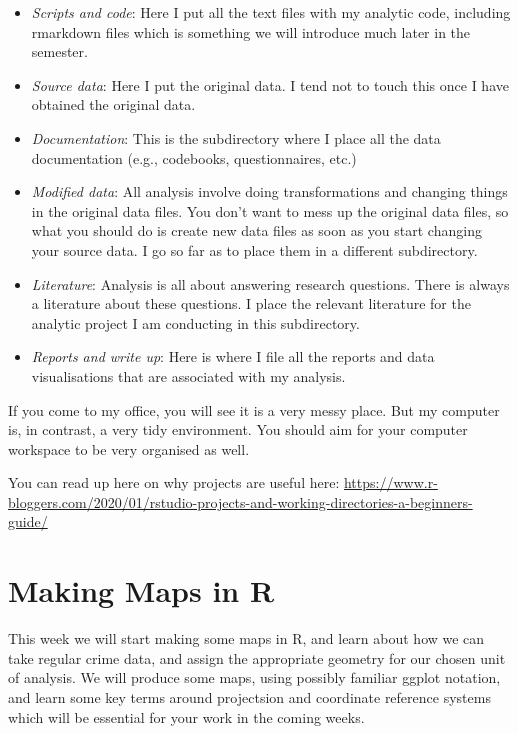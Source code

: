 \documentclass[
]{book}
\begin{document}
\begin{itemize}
\item
  \emph{Scripts and code}: Here I put all the text files with my analytic code, including rmarkdown files which is something we will introduce much later in the semester.
\item
  \emph{Source data}: Here I put the original data. I tend not to touch this once I have obtained the original data.
\item
  \emph{Documentation}: This is the subdirectory where I place all the data documentation (e.g., codebooks, questionnaires, etc.)
\item
  \emph{Modified data}: All analysis involve doing transformations and changing things in the original data files. You don't want to mess up the original data files, so what you should do is create new data files as soon as you start changing your source data. I go so far as to place them in a different subdirectory.
\item
  \emph{Literature}: Analysis is all about answering research questions. There is always a literature about these questions. I place the relevant literature for the analytic project I am conducting in this subdirectory.
\item
  \emph{Reports and write up}: Here is where I file all the reports and data visualisations that are associated with my analysis.
\end{itemize}

If you come to my office, you will see it is a very messy place. But my computer is, in contrast, a very tidy environment. You should aim for your computer workspace to be very organised as well.

You can read up here on why projects are useful here: \url{https://www.r-bloggers.com/2020/01/rstudio-projects-and-working-directories-a-beginners-guide/}

\hypertarget{making-maps-in-r}{%
\chapter{Making Maps in R}\label{making-maps-in-r}}

This week we will start making some maps in R, and learn about how we can take regular crime data, and assign the appropriate geometry for our chosen unit of analysis. We will produce some maps, using possibly familiar ggplot notation, and learn some key terms around projectsion and coordinate reference systems which will be essential for your work in the coming weeks.
\end{document}
